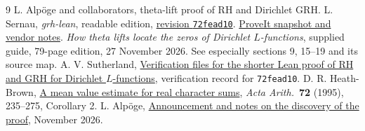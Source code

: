 \begin{thebibliography}{9}\small
{} L. Alp\"oge and collaborators, theta-lift proof of RH and Dirichlet GRH. L. Sernau, \emph{grh-lean}, readable edition, \href{https://github.com/lsernau/grh-lean/tree/72fead102f663d5c7a407964a13dc0cf9d977207/grh}{revision \texttt{72fead10}}. \href{https://github.com/VladimirReshetnikov/ProveIt/tree/d8415e76ad850651f8c0083afe689dd9f4a45a10/Analysis/GeneralizedRiemannHypothesis/vendor/grh-lean}{ProveIt snapshot and vendor notes}.
 \emph{How theta lifts locate the zeros of Dirichlet $L$-functions}, supplied guide, 79-page edition, 27 November 2026. See especially sections 9, 15--19 and its source map.
 A. V. Sutherland, \href{https://math.mit.edu/~drew/shortgrh/}{Verification files for the shorter Lean proof of RH and GRH for Dirichlet $L$-functions}, verification record for \texttt{72fead10}.
 D. R. Heath-Brown, \href{https://doi.org/10.4064/aa-72-3-235-275}{A mean value estimate for real character sums}, \emph{Acta Arith.}\ \textbf{72} (1995), 235--275, Corollary 2.
 L. Alp\"oge, \href{https://alpo.ge/remark.pdf}{Announcement and notes on the discovery of the proof}, November 2026.
\end{thebibliography}
